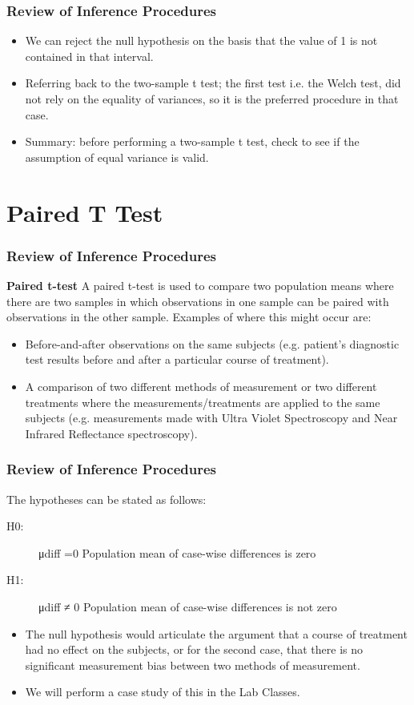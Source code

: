 \documentclass{beamer}
\begin{document}
\begin{frame}
\frametitle{Review of Inference Procedures}
\Large
\begin{itemize}
	\item We can reject the null hypothesis on the basis that the value of 1 is
	not contained in that interval.
\item 	Referring back to the two-sample t test; the first test i.e. the Welch
	test, did not rely on the equality of variances, so it is the preferred
	procedure in that case.
\item	Summary: before performing a two-sample t test, check to see if
	the assumption of equal variance is valid.
\end{itemize}


\end{frame}
\section{Paired T Test}
\begin{frame}
\frametitle{Review of Inference Procedures}
\Large
\noindent \textbf{Paired t-test}
A paired t-test is used to compare two population means where
there are two samples in which observations in one sample can be
paired with observations in the other sample.
Examples of where this might occur are:
\begin{itemize}
	\item Before-and-after observations on the same subjects (e.g.
	patient’s diagnostic test results before and after a particular
	course of treatment).
\item A comparison of two different methods of measurement or
	two different treatments where the measurements/treatments
	are applied to the same subjects (e.g. measurements made
	with Ultra Violet Spectroscopy and Near Infrared Reflectance
	spectroscopy).
\end{itemize}


\end{frame}
\begin{frame}
\frametitle{Review of Inference Procedures}
\Large
The hypotheses can be stated as follows:
\begin{description}
\item[H0:] μdiff =0 Population mean of case-wise differences is zero
\item[H1:] μdiff ≠ 0 Population mean of case-wise differences is not zero
\end{description}
\begin{itemize}
\item The null hypothesis would articulate the argument that a course of
treatment had no effect on the subjects, or for the second case,
that there is no significant measurement bias between two methods
of measurement.
\item We will perform a case study of this in the Lab Classes.
\end{itemize}
\end{frame}
\end{document}

